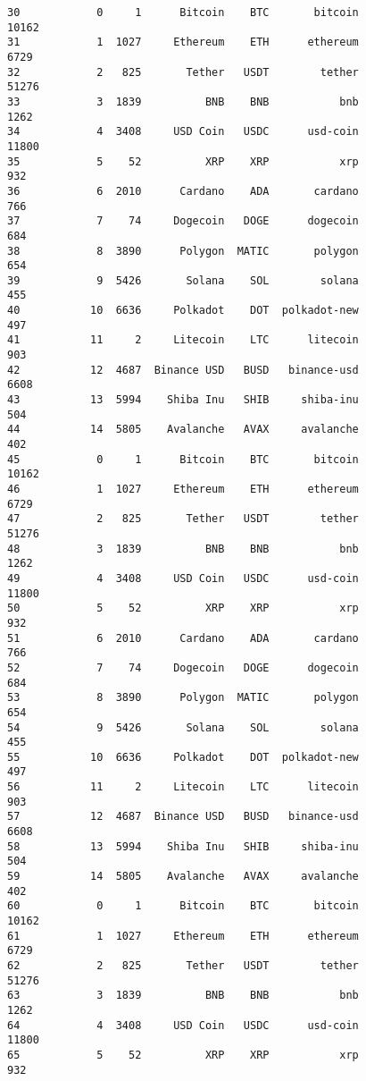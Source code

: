 \documentclass[11pt]{article}
\begin{document}
\begin{tcolorbox}[breakable, size=fbox, boxrule=.5pt, pad at break*=1mm, opacityfill=0]
\begin{Verbatim}[commandchars=\\\{\}]
30            0     1      Bitcoin    BTC       bitcoin             10162
31            1  1027     Ethereum    ETH      ethereum              6729
32            2   825       Tether   USDT        tether             51276
33            3  1839          BNB    BNB           bnb              1262
34            4  3408     USD Coin   USDC      usd-coin             11800
35            5    52          XRP    XRP           xrp               932
36            6  2010      Cardano    ADA       cardano               766
37            7    74     Dogecoin   DOGE      dogecoin               684
38            8  3890      Polygon  MATIC       polygon               654
39            9  5426       Solana    SOL        solana               455
40           10  6636     Polkadot    DOT  polkadot-new               497
41           11     2     Litecoin    LTC      litecoin               903
42           12  4687  Binance USD   BUSD   binance-usd              6608
43           13  5994    Shiba Inu   SHIB     shiba-inu               504
44           14  5805    Avalanche   AVAX     avalanche               402
45            0     1      Bitcoin    BTC       bitcoin             10162
46            1  1027     Ethereum    ETH      ethereum              6729
47            2   825       Tether   USDT        tether             51276
48            3  1839          BNB    BNB           bnb              1262
49            4  3408     USD Coin   USDC      usd-coin             11800
50            5    52          XRP    XRP           xrp               932
51            6  2010      Cardano    ADA       cardano               766
52            7    74     Dogecoin   DOGE      dogecoin               684
53            8  3890      Polygon  MATIC       polygon               654
54            9  5426       Solana    SOL        solana               455
55           10  6636     Polkadot    DOT  polkadot-new               497
56           11     2     Litecoin    LTC      litecoin               903
57           12  4687  Binance USD   BUSD   binance-usd              6608
58           13  5994    Shiba Inu   SHIB     shiba-inu               504
59           14  5805    Avalanche   AVAX     avalanche               402
60            0     1      Bitcoin    BTC       bitcoin             10162
61            1  1027     Ethereum    ETH      ethereum              6729
62            2   825       Tether   USDT        tether             51276
63            3  1839          BNB    BNB           bnb              1262
64            4  3408     USD Coin   USDC      usd-coin             11800
65            5    52          XRP    XRP           xrp               932

\end{Verbatim}
\end{tcolorbox}
\end{document}
